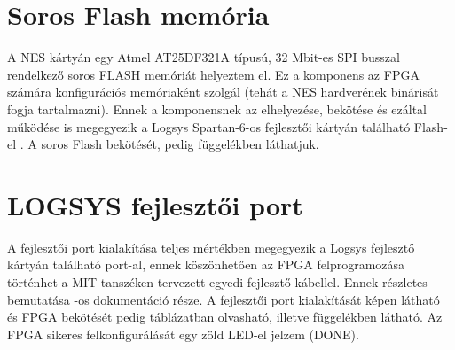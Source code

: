 \section{Soros Flash memória}
	
	A NES kártyán egy Atmel AT25DF321A típusú, 32 Mbit-es SPI busszal rendelkező soros FLASH memóriát helyeztem el. Ez a komponens az FPGA számára konfigurációs memóriaként szolgál (tehát a NES hardverének binárisát fogja tartalmazni). Ennek a komponensnek az elhelyezése, bekötése és ezáltal működése is megegyezik a Logsys Spartan-6-os fejlesztői kártyán található Flash-el \cite{spatan6}. A soros Flash bekötését, pedig  függelékben láthatjuk.
	
\section{LOGSYS fejlesztői port}
	
	A fejlesztői port kialakítása teljes mértékben megegyezik a Logsys fejlesztő kártyán található port-al, ennek köszönhetően az FPGA felprogramozása történhet a MIT tanszéken tervezett egyedi fejlesztő kábellel. Ennek részletes bemutatása -os dokumentáció része. A fejlesztői port kialakítását  képen látható és FPGA bekötését pedig  táblázatban olvasható, illetve  függelékben látható. Az FPGA sikeres felkonfigurálását egy zöld LED-el jelzem (DONE). %
	
